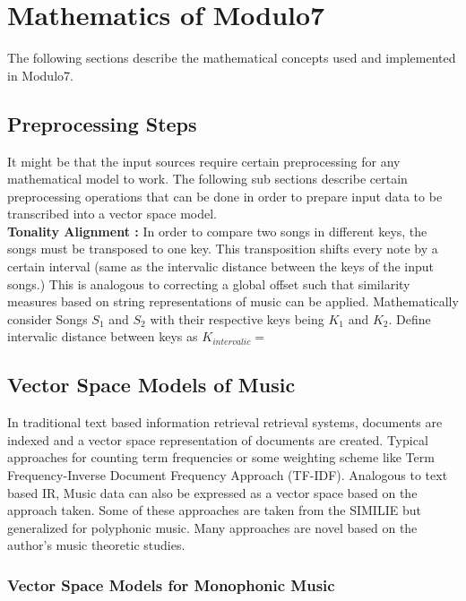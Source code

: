 \chapter{Mathematics of Modulo7}
\label{sec:mir math}

\noindent The following sections describe the mathematical concepts used and implemented in Modulo7.

\section{Preprocessing Steps}

\noindent It might be that the input sources require certain preprocessing for any mathematical model to work. The following sub sections describe certain preprocessing operations that can be done in order to prepare input data to be transcribed into a vector space model. \\

\noindent \textbf{Tonality Alignment :} In order to compare two songs in different keys, the songs must be transposed to one key. This transposition shifts every note by a certain interval (same as the intervalic distance between the keys of the input songs.) This is analogous to correcting a global offset such that similarity measures based on string representations of music can be applied. Mathematically consider Songs $S_1$ and $S_2$ with their respective keys being $K_1$ and $K_2$. Define intervalic distance between keys as $K_{intervalic} = $

\section{Vector Space Models of Music}

\noindent In traditional text based information retrieval retrieval systems, documents are indexed and a vector space representation of documents are created. Typical approaches for counting term frequencies or some weighting scheme like Term Frequency-Inverse Document Frequency Approach (TF-IDF). Analogous to text based IR, Music data can also be expressed as a vector space based on the approach taken. Some of these approaches are taken from the SIMILIE \cite{similietechnicalmanual} but generalized for polyphonic music. Many approaches are novel based on the author's music theoretic studies. 

\subsection{Vector Space Models for Monophonic Music}

